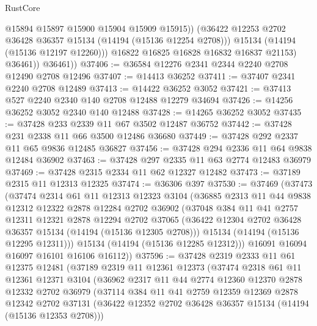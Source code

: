 \begin{lexlean}{RustCore}
\begin{coremodule}
                    @15894
                    @15897
                    @15900
                    @15904
                    @15909
                    @15915))
                (@36422 @12253 @2702 @36428 @36357 @15134 (@14194 (@15136 @12254 @2708)))
                @15134
                (@14194 (@15136 @12197 @12260)))
              @16822
              @16825
              @16828
              @16832
              @16837
              @21153)
            @36461))
        @36461))
@37406 := @36584 @12276 @2341 @2344 @2240 @2708 @12490 @2708 @12496
@37407 := @14413 @36252
@37411 := @37407 @2341 @2240 @2708 @12489
@37413 := @14422 @36252 @3052
@37421 := @37413 @527 @2240 @2340 @140 @2708 @12488 @12279 @34694
@37426 := @14256 @36252 @3052 @2340 @140 @12488
@37428 := @14265 @36252 @3052
@37435 := @37428 @233 @2339 @11 @67 @3502 @12487 @36752
@37442 := @37428 @231 @2338 @11 @66 @3500 @12486 @36680
@37449 := @37428 @292 @2337 @11 @65 @9836 @12485 @36827
@37456 := @37428 @294 @2336 @11 @64 @9838 @12484 @36902
@37463 := @37428 @297 @2335 @11 @63 @2774 @12483 @36979
@37469 := @37428 @2315 @2334 @11 @62 @12327 @12482
@37473 := @37189 @2315 @11 @12313 @12325
@37474 := @36306 @397
@37530 := @37469
    (@37473
      (@37474
        @2314
        @61
        @11
        @12313
        @12323
        @3104
        (@36885
          @2313
          @11
          @44
          @9838
          @12312
          @12322
          @2878
          @12284
          @2702
          @36902
          (@37048
            @384
            @11
            @41
            @2757
            @12311
            @12321
            @2878
            @12294
            @2702
            @37065
            (@36422 @12304 @2702 @36428 @36357 @15134 (@14194 (@15136 @12305 @2708)))
            @15134
            (@14194 (@15136 @12295 @12311)))
          @15134
          (@14194 (@15136 @12285 @12312)))
        @16091
        @16094
        @16097
        @16101
        @16106
        @16112))
@37596 := @37428
    @2319
    @2333
    @11
    @61
    @12375
    @12481
    (@37189
      @2319
      @11
      @12361
      @12373
      (@37474
        @2318
        @61
        @11
        @12361
        @12371
        @3104
        (@36962
          @2317
          @11
          @44
          @2774
          @12360
          @12370
          @2878
          @12332
          @2702
          @36979
          (@37114
            @384
            @11
            @41
            @2759
            @12359
            @12369
            @2878
            @12342
            @2702
            @37131
            (@36422 @12352 @2702 @36428 @36357 @15134 (@14194 (@15136 @12353 @2708)))

\end{coremodule}
\end{lexlean}
